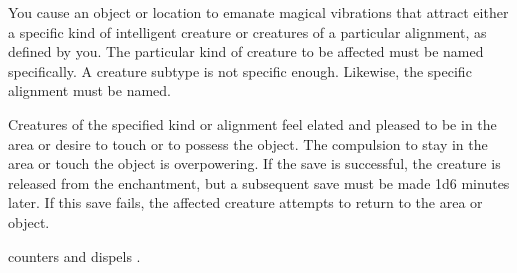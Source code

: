 \spellrng{\rngclose}
\begin{spelleffect}
You cause an object or location to emanate magical vibrations that attract either a specific kind of intelligent creature or creatures of a particular alignment, as defined by you. The particular kind of creature to be affected must be named specifically. A creature subtype is not specific enough. Likewise, the specific alignment must be named.
\par Creatures of the specified kind or alignment feel elated and pleased to be in the area or desire to touch or to possess the object. The compulsion to stay in the area or touch the object is overpowering. If the save is successful, the creature is released from the enchantment, but a subsequent save must be made 1d6 minutes later. If this save fails, the affected creature attempts to return to the area or object.
\end{spelleffect}
\begin{spellnotes}
 counters and dispels .
\end{spellnotes}


